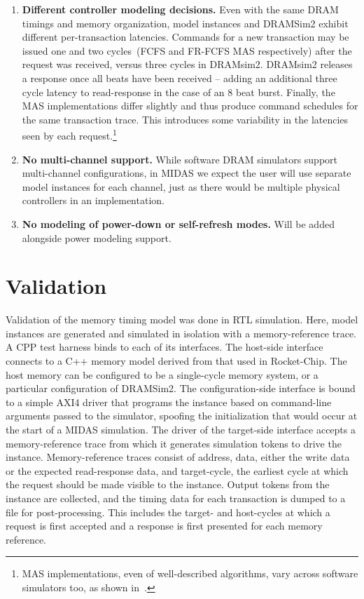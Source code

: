\begin{enumerate}
    \item \textbf{Different controller modeling decisions.} Even with the same
        DRAM timings and memory organization, model instances and
        DRAMSim2 exhibit different per-transaction latencies. Commands for a
        new transaction may be issued one and two cycles~(FCFS and FR-FCFS MAS
        respectively) after the request was received, versus three cycles in
        DRAMsim2. DRAMsim2 releases a response once all beats have been
        received -- adding an additional three cycle latency to read-response
        in the case of an 8 beat burst. Finally, the MAS implementations differ
        slightly and thus produce command schedules for the same transaction
        trace. This introduces some variability in the latencies seen by each
        request.\footnote{MAS implementations, even of well-described
        algorithms, vary across software simulators too, as shown
        in~\cite{ramulator}.}

    \item \textbf{No multi-channel support.} While software DRAM simulators
        support multi-channel configurations, in MIDAS we expect the user will
        use separate model instances for each channel, just as there would be
        multiple physical controllers in an implementation.

    \item \textbf{No modeling of power-down or self-refresh modes.} Will be
        added alongside power modeling support.

\end{enumerate}

\section{Validation}

Validation of the memory timing model was done in RTL simulation. Here, model
instances are generated and simulated in isolation with a memory-reference trace.
A CPP test harness binds to each of its interfaces.  The host-side interface
connects to a C++ memory model derived from that used in Rocket-Chip. The host
memory can be configured to be a single-cycle memory system, or a particular
configuration of DRAMSim2.  The configuration-side interface is bound to a
simple AXI4 driver that programs the instance based on command-line arguments
passed to the simulator, spoofing the initialization that would occur at the
start of a MIDAS simulation. The driver of the target-side interface accepts a
memory-reference trace from which it generates simulation tokens to drive the instance.
Memory-reference traces consist of address, data, either the write data or the
expected read-response data, and target-cycle, the earliest cycle at which the
request should be made visible to the instance. Output tokens from the instance are
collected, and the timing data for each transaction is dumped to a file for
post-processing. This includes the target- and host-cycles at which a request is
first accepted and a response is first presented for each memory reference.

